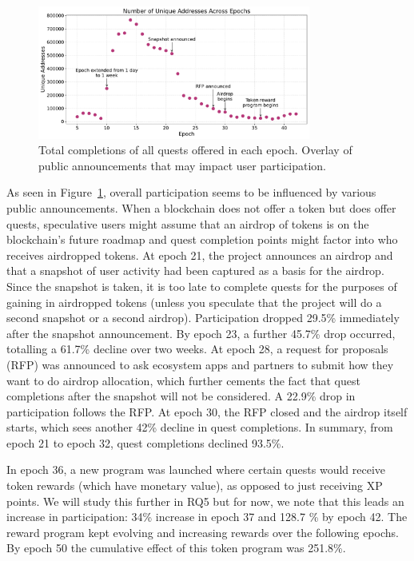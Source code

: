 \begin{figure}[t]
    \centering
    \includegraphics[width=0.8\textwidth]{figures/events.pdf}
    \caption{Total completions of all quests offered in each epoch. Overlay of public announcements that may impact user participation.}
    \label{fig:events}
\end{figure}

As seen in  Figure~\ref{fig:events}, overall participation seems to be influenced by various public announcements. When a blockchain does not offer a token but does offer quests, speculative users might assume that an airdrop of tokens is on the blockchain's future roadmap and quest completion points might factor into who receives airdropped tokens. At epoch 21, the project announces an airdrop and that a snapshot of user activity had been captured as a basis for the airdrop. Since the snapshot is taken, it is too late to complete quests for the purposes of gaining in airdropped tokens (unless you speculate that the project will do a second snapshot or a second airdrop). Participation dropped 29.5\% immediately after the snapshot announcement. By epoch 23, a further 45.7\% drop occurred, totalling a 61.7\% decline over two weeks. At epoch 28, a request for proposals (RFP) was announced to ask ecosystem apps and partners to submit how they want to do airdrop allocation, which further cements the fact that quest completions after the snapshot will not be considered. A 22.9\% drop in participation follows the RFP. At epoch 30, the RFP closed and the airdrop itself starts, which sees another 42\% decline in quest completions. In summary, from epoch 21 to epoch 32, quest completions declined 93.5\%.  

In epoch 36, a new program was launched where certain quests would receive token rewards (which have monetary value), as opposed to just receiving XP points. We will study this further in RQ5 but for now, we note that this leads an increase in participation: 34\% increase in epoch 37 and 128.7 \% by epoch 42. The reward program kept evolving and increasing rewards over the following epochs. By epoch 50 the cumulative effect of this token program was 251.8\%.

